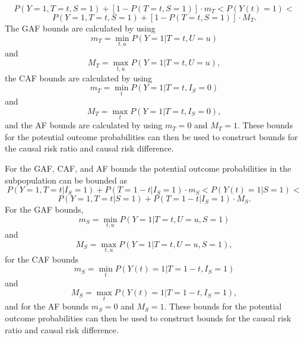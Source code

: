 \[
P(Y=1,T=t,S=1)+\left[1-P(T=t,S=1)\right]\cdot m_T < P(Y(t)=1) <
\]
\[
P(Y=1,T=t,S=1)+\left[1-P(T=t,S=1)\right]\cdot M_T.
\]
The GAF bounds are calculated by using
\[
    m_T=\min_{t,u}P(Y=1|T=t,U=u)
\]
and
\[
    M_T= \max_{t,u}P(Y=1|T=t,U=u),
\]
the CAF bounds are calculated by using
\[
    m_T=\min_t P(Y=1|T=t,I_S=0)
\]
and
\[
    M_T=\max_t P(Y=1|T=t,I_S=0),
\]
and the AF bounds are calculated by using \(m_T=0\) and \(M_T=1\). These bounds
for the potential outcome probabilities can then be used to construct bounds
for the causal risk ratio and causal risk difference.

For the GAF, CAF, and AF bounds the potential outcome probabilities in the
subpopulation can be bounded as
\[
    P(Y=1,T=t|I_S=1) + P(T=1-t|I_S=1)\cdot m_S < P(Y(t)=1|S=1) < 
\]
\[
    P(Y=1,T=t|S=1) + P(T=1-t|I_S=1)\cdot M_S.
\]
For the GAF bounds,
\[
    m_S=\min_{t,u}P(Y=1|T=t,U=u,S=1)
\]
and
\[
    M_S =\max_{t,u}P(Y=1|T=t,U=u,S=1),
\]
for the CAF bounds
\[
    m_S=\min_t P(Y(t)=1|T=1-t,I_S=1)
\]
and
\[
    M_S=\max_t P(Y(t)=1|T=1-t,I_S=1),
\]
and for the AF bounds \(m_S=0\) and \(M_S=1\). These bounds for the potential
outcome probabilities can then be used to construct bounds for the causal risk
ratio and causal risk difference.



\address{%
Stina Zetterstrom\\
Uppsala University\\%
Department of Statistics\\ Uppsala, Sweden\\
%
\url{https://www.statistik.uu.se/?languageId=1}\\%
\textit{ORCID: \href{https://orcid.org/0000-0003-0730-9425}{0000-0003-0730-9425}}\\%
\href{mailto:stina.zetterstrom@gmail.com}{\nolinkurl{stina.zetterstrom@gmail.com}}%
}

\address{%
Ingeborg Waernbaum\\
Uppsala University\\%
Department of Statistics\\ Uppsala, Sweden\\
%
\url{https://www.statistik.uu.se/?languageId=1}\\%
\textit{ORCID: \href{https://orcid.org/0000-0002-4457-5311}{0000-0002-4457-5311}}\\%
\href{mailto:ingeborg.waernbaum@statistics.uu.se}{\nolinkurl{ingeborg.waernbaum@statistics.uu.se}}%
}
